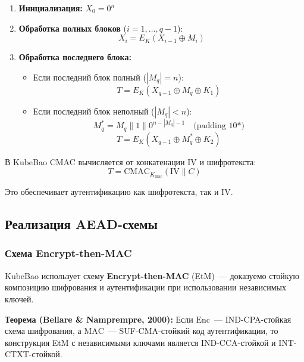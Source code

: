\documentclass[a4paper,14pt]{extarticle}
\begin{document}
\begin{enumerate}
    \item \textbf{Инициализация:} $X_0 = 0^n$
    \item \textbf{Обработка полных блоков} ($i = 1, \ldots, q-1$):
    \begin{equation}
        X_i = E_K(X_{i-1} \oplus M_i)
    \end{equation}
    \item \textbf{Обработка последнего блока:}
    \begin{itemize}
        \item Если последний блок полный ($|M_q| = n$):
        \begin{equation}
            T = E_K(X_{q-1} \oplus M_q \oplus K_1)
        \end{equation}
        \item Если последний блок неполный ($|M_q| < n$):
        \begin{equation}
            M_q^* = M_q \| 1 \| 0^{n - |M_q| - 1} \quad \text{(padding 10*)}
        \end{equation}
        \begin{equation}
            T = E_K(X_{q-1} \oplus M_q^* \oplus K_2)
        \end{equation}
    \end{itemize}
\end{enumerate}

В KubeBao CMAC вычисляется от конкатенации IV и шифротекста:
\begin{equation}
    T = \mathrm{CMAC}_{K_{\mathrm{mac}}}(\mathrm{IV} \| C)
\end{equation}

Это обеспечивает аутентификацию как шифротекста, так и IV.

\subsection{Реализация AEAD-схемы}

\subsubsection{Схема Encrypt-then-MAC}

KubeBao использует схему \textbf{Encrypt-then-MAC} (EtM)~--- доказуемо стойкую композицию шифрования и аутентификации при использовании независимых ключей.

\textbf{Теорема (Bellare \& Namprempre, 2000):} Если $\mathrm{Enc}$~--- IND-CPA-стойкая схема шифрования, а $\mathrm{MAC}$~--- SUF-CMA-стойкий код аутентификации, то конструкция EtM с независимыми ключами является IND-CCA-стойкой и INT-CTXT-стойкой.
\end{document}
